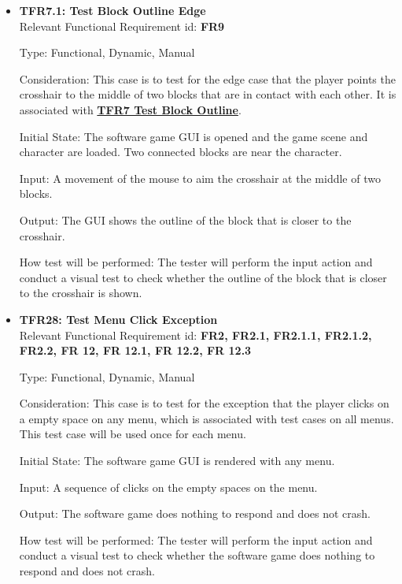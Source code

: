 \documentclass[12pt, titlepage]{article}
\begin{document}
\begin{itemize}
\item{\textbf{TFR7.1: Test Block Outline Edge}\\}
Relevant Functional Requirement id: \textbf{FR9}

Type: Functional, Dynamic, Manual

Consideration: This case is to test for the edge case that the player points the crosshair to the middle of two blocks that are in contact with each other. It is associated with \hyperref[outline]{\bf TFR7 Test Block Outline}.

Initial State: The software game GUI is opened and the game scene and character are loaded. Two connected blocks are near the character.

Input: A movement of the mouse to aim the crosshair at the middle of two blocks.

Output: The GUI shows the outline of the block that is closer to the crosshair.

How test will be performed: The tester will perform the input action and conduct a visual test to check whether the outline of the block that is closer to the crosshair is shown.

\item{\textbf{TFR28: Test Menu Click Exception}\\}
Relevant Functional Requirement id: \textbf{FR2, FR2.1, FR2.1.1, FR2.1.2, FR2.2, FR 12, FR 12.1, FR 12.2, FR 12.3}

Type: Functional, Dynamic, Manual

Consideration: This case is to test for the exception that the player clicks on a empty space on any menu, which is associated with test cases on all menus. This test case will be used once for each menu.

Initial State: The software game GUI is rendered with any menu.

Input: A sequence of clicks on the empty spaces on the menu.

Output: The software game does nothing to respond and does not crash.

How test will be performed: The tester will perform the input action and conduct a visual test to check whether the software game does nothing to respond and does not crash.
\end{itemize}
\end{document}
